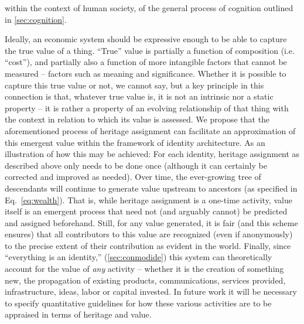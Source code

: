 \documentclass[pra,twocolumn,groupedaddress,10pt]{revtex4}
\theoremstyle{definition}
\begin{document}
within the context of human society, of the general process of cognition outlined in \autoref{sec:cognition}.

Ideally, an economic system should be expressive enough to be able to capture the true value of a thing. ``True'' value is partially a function of composition (i.e. ``cost''), and partially also a function of more intangible factors that cannot be measured -- factors such as meaning and significance. Whether it is possible to capture this true value or not, we cannot say, but a key principle in this connection is that, whatever true value is, it is not an intrinsic nor a static property -- it is rather a property of an evolving relationship of that thing with the context in relation to which its value is assessed. We propose that the aforementioned process of heritage assignment can facilitate an approximation of this emergent value within the framework of identity architecture. As an illustration of how this may be achieved: For each identity, heritage assignment as described above only needs to be done once (although it can certainly be corrected and improved as needed). Over time, the ever-growing tree of descendants will continue to generate value upstream to ancestors (as specified in Eq.~\ref{eq:wealth}). That is, while heritage assignment is a one-time activity, value itself is an emergent process that need not (and arguably cannot) be predicted and assigned beforehand. Still, for any value generated, it is fair (and this scheme ensures) that all contributors to this value are recognized (even if anonymously) to the precise extent of their contribution as evident in the world. Finally, since ``everything is an identity,'' (\autoref{sec:conmodide}) this system can theoretically account for the value of \textit{any} activity -- whether it is the creation of something new, the propagation of existing products, communications, services provided, infrastructure, ideas, labor or capital invested. In future work it will be necessary to specify quantitative guidelines for how these various activities are to be appraised in terms of heritage and value.
\end{document}
